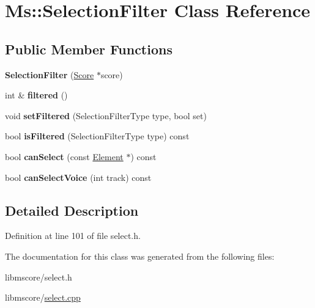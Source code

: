 \hypertarget{class_ms_1_1_selection_filter}{}\section{Ms\+:\+:Selection\+Filter Class Reference}
\label{class_ms_1_1_selection_filter}
\subsection*{Public Member Functions}
\begin{DoxyCompactItemize}
\item 
\mbox{\label{class_ms_1_1_selection_filter_a885d2134f90c817da40be50b0413b423}} 
{\bfseries Selection\+Filter} (\hyperlink{class_ms_1_1_score}{Score} $\ast$score)
\item 
\mbox{\label{class_ms_1_1_selection_filter_adb917d05def6e0aea7316488f1c2f281}} 
int \& {\bfseries filtered} ()
\item 
\mbox{\label{class_ms_1_1_selection_filter_aee6524a9a07f64226f30112972755b44}} 
void {\bfseries set\+Filtered} (Selection\+Filter\+Type type, bool set)
\item 
\mbox{\label{class_ms_1_1_selection_filter_aa144080dfade96fb184d1122892cdbdd}} 
bool {\bfseries is\+Filtered} (Selection\+Filter\+Type type) const
\item 
\mbox{\label{class_ms_1_1_selection_filter_a2df3f78bf495c4a87f235d6ac75f4e43}} 
bool {\bfseries can\+Select} (const \hyperlink{class_ms_1_1_element}{Element} $\ast$) const
\item 
\mbox{\label{class_ms_1_1_selection_filter_a4862ccc03e23281c6041408f37168eb0}} 
bool {\bfseries can\+Select\+Voice} (int track) const
\end{DoxyCompactItemize}


\subsection{Detailed Description}


Definition at line 101 of file select.\+h.



The documentation for this class was generated from the following files\+:\begin{DoxyCompactItemize}
\item 
libmscore/select.\+h\item 
libmscore/\hyperlink{select_8cpp}{select.\+cpp}\end{DoxyCompactItemize}
